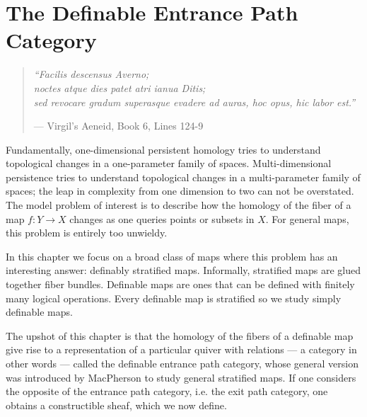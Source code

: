 
%
%

\chapter{The Definable Entrance Path Category}
\label{subsec:strat}

\begin{quote}
{\em ``Facilis descensus Averno;\\
noctes atque dies patet atri ianua Ditis;\\
sed revocare gradum superasque evadere ad auras,
hoc opus, hic labor est.''}
\begin{flushright} --- Virgil's Aeneid, Book 6, Lines 124-9 \end{flushright}
\end{quote}

Fundamentally, one-dimensional persistent homology tries to understand topological changes in a one-parameter family of spaces. Multi-dimensional persistence tries to understand topological changes in a multi-parameter family of spaces; the leap in complexity from one dimension to two can not be overstated. The model problem of interest is to describe how the homology of the fiber of a map $f:Y\to X$ changes as one queries points or subsets in $X$. For general maps, this problem is entirely too unwieldy. 

In this chapter we focus on a broad class of maps where this problem has an interesting answer: definably stratified maps. Informally, stratified maps are glued together fiber bundles. Definable maps are ones that can be defined with finitely many logical operations. Every definable map is stratified so we study simply definable maps.

The upshot of this chapter is that the homology of the fibers of a definable map give rise to a representation of a particular quiver with relations --- a category in other words --- called the definable entrance path category, whose general version was introduced by MacPherson to study general stratified maps. If one considers the opposite of the entrance path category, i.e. the exit path category, one obtains a constructible sheaf, which we now define.

